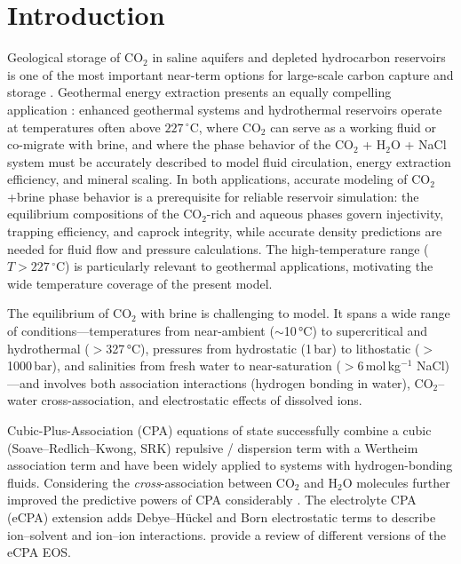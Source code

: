 \documentclass[preprint,12pt,number]{elsarticle}
\begin{document}
\linenumbers

\section{Introduction}
\label{sec:intro}

Geological storage of CO$_2$ in saline aquifers and depleted hydrocarbon reservoirs is one
of the most important near-term options for large-scale carbon capture and storage
\citep{Metz2005, Orr2004}.
Geothermal energy extraction presents an equally compelling application \citep{solovsky2026efficient}:
enhanced geothermal systems and hydrothermal reservoirs operate at temperatures often above
$227\,^\circ$C, where CO$_2$ can serve as a working fluid or co-migrate with brine, and where the
phase behavior of the CO$_2$ + H$_2$O + NaCl system must be accurately described to model
fluid circulation, energy extraction efficiency, and mineral scaling.
In both applications, accurate modeling of CO$_2$+brine phase behavior is a prerequisite
for reliable reservoir simulation: the equilibrium compositions of the CO$_2$-rich and aqueous
phases govern injectivity, trapping efficiency, and caprock integrity, while accurate density
predictions are needed for fluid flow and pressure calculations.
The high-temperature range ($T > 227\,^\circ$C) is particularly relevant to geothermal applications,
motivating the wide temperature coverage of the present model.

The equilibrium of CO$_2$ with brine is challenging to model. It spans a wide range of
conditions---temperatures from near-ambient ($\sim$10\,°C) to supercritical and hydrothermal
($>$327\,°C), pressures from hydrostatic (1\,bar) to lithostatic ($>$1000\,bar), and salinities
from fresh water to near-saturation ($>$6\,mol\,kg$^{-1}$ NaCl)---and involves both association
interactions (hydrogen bonding in water), CO$_2$--water cross-association, and electrostatic
effects of dissolved ions.

Cubic-Plus-Association (CPA) equations of state \citep{Kontogeorgis1996} successfully combine
a cubic (Soave--Redlich--Kwong, SRK) repulsive / dispersion term with a Wertheim association
term \citep{Wertheim1984} and have been widely applied to systems with hydrogen-bonding fluids.
Considering the \textit{cross}-association between CO$_2$ and H$_2$O molecules further improved the predictive powers of CPA considerably \citep{LiFiroozabadi2009}.
The electrolyte CPA (eCPA) extension \citep{MaribMogensen2015} adds Debye--Hückel and Born
electrostatic terms to describe ion--solvent and ion--ion interactions. \citet{kontogeorgis2022review} provide a review of different versions of the eCPA EOS.
\end{document}
